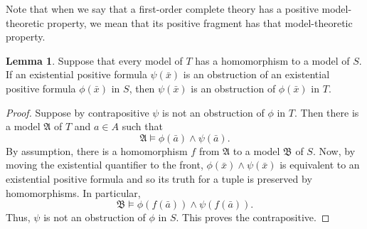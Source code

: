 \documentclass{amsart}
\theoremstyle{definition}
\newtheorem{lemma}[theorem]{Lemma}
\theoremstyle{remark}
\numberwithin{equation}{section}
\newcommand{\fa}{\mathfrak{A}}
\newcommand{\fb}{\mathfrak{B}}
\begin{document}
Note that when we say that a first-order complete theory has a positive model-theoretic property, we mean that its positive fragment has that model-theoretic property.




\begin{lemma}\label{negpres} Suppose that every model of $T$ has a homomorphism to a model of $S$. If an existential positive formula $\psi(\bar{x})$ is an obstruction of an existential positive formula $\phi(\bar{x})$ in $S$, then $\psi(\bar{x})$ is an obstruction of $\phi(\bar{x})$ in $T$. 
\end{lemma}
\begin{proof}
    Suppose by contrapositive $\psi$ is not an obstruction of $\phi$ in $T$. Then  there is a model $\fa$ of $T$ and $a\in A$ such that 
\[\fa\vDash \phi(\bar{a})\wedge\psi(\bar{a}).\]
By assumption, there is a homomorphism $f$ from $\fa$ to a model $\fb$ of $S$. Now, by moving the existential quantifier to the front, $\phi(\bar{x})\wedge\psi(\bar{x})$ is equivalent to an existential positive formula and so its truth for a tuple is preserved by homomorphisms. In particular, 
\[\fb\vDash \phi(f(\bar{a}))\wedge\psi(f(\bar{a})).\]
Thus, $\psi$ is not an obstruction of $\phi$ in $S$. This proves the contrapositive. 
\end{proof}
\end{document}
